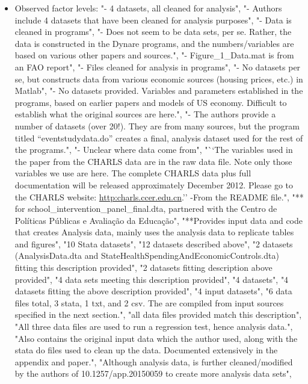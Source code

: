 \documentclass[]{article}
\providecommand{\tightlist}{%
  \setlength{\itemsep}{0pt}\setlength{\parskip}{0pt}}
\begin{document}
\begin{itemize}
\tightlist
\item
  Observed factor levels: "- 4 datasets, all cleaned for analysis", "-
  Authors include 4 datasets that have been cleaned for analysis
  purposes", "- Data is cleaned in programs", "- Does not seem to be
  data sets, per se. Rather, the data is constructed in the Dynare
  programs, and the numbers/variables are based on various other papers
  and sources.", "- Figure\_1\_Data.mat is from an FAO report", "- Files
  cleaned for analysis in programs", "- No datasets per se, but
  constructs data from various economic sources (housing prices, etc.)
  in Matlab", "- No datasets provided. Variables and parameters
  established in the programs, based on earlier papers and models of US
  economy. Difficult to establish what the original sources are here.",
  "- The authors provide a number of datasets (over 20!). They are from
  many sources, but the program titled ``eventstudydata.do'' creates a
  final, analysis dataset used for the rest of the programs.", "-
  Unclear where data come from", "``The variables used in the paper from
  the CHARLS data are in the raw data file. Note only those variables we
  use are here. The complete CHARLS data plus full documentation will be
  released approximately December 2012. Please go to the CHARLS website:
  \url{http:charls.ccer.edu.cn}.'' -From the README file.", "** for
  school\_intervention\_panel\_final.dta, partnered with the Centro de
  Políticas Públicas e Avaliação da Educação", "**Provides input data
  and code that creates Analysis data, mainly uses the analysis data to
  replicate tables and figures", "10 Stata datasets", "12 datasets
  described above", "2 datasets (AnalysisData.dta and
  StateHealthSpendingAndEconomicControls.dta) fitting this description
  provided", "2 datasets fitting description above provided", "4 data
  sets meeting this description provided", "4 datasets", "4 datasets
  fitting the above description provided", "4 input datasets", "6 data
  files total, 3 stata, 1 txt, and 2 csv. The are compiled from input
  sources specified in the next section.", "all data files provided
  match this description", "All three data files are used to run a
  regression test, hence analysis data.", "Also contains the original
  input data which the author used, along with the stata do files used
  to clean up the data. Documented extensively in the appendix and
  paper.", "Although analysis data, is further cleaned/modified by the
  authors of 10.1257/app.20150059 to create more analysis data sets",

\end{itemize}
\end{document}
